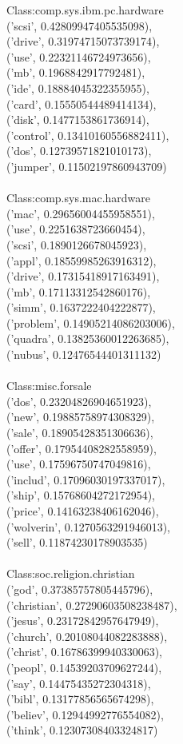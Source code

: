\documentclass[11pt]{article}
\begin{document}
Class:comp.sys.ibm.pc.hardware
\\
('scsi', 0.42809947405535098),\\ ('drive', 0.31974715073739174), \\ ('use', 0.22321146724973656), \\
('mb', 0.1968842917792481), \\
('ide', 0.18884045322355955),\\ ('card', 0.15550544489414134), \\ ('disk', 0.1477153861736914), \\ ('control', 0.13410160556882411),\\ ('dos', 0.12739571821010173),\\ ('jumper', 0.11502197860943709) \\ 
\\
Class:comp.sys.mac.hardware \\
('mac', 0.29656004455958551), \\ ('use', 0.2251638723660454),\\ ('scsi', 0.1890126678045923),\\ ('appl', 0.18559985263916312),\\ ('drive', 0.17315418917163491),\\ ('mb', 0.17113312542860176),\\ ('simm', 0.1637222404222877),\\ ('problem', 0.14905214086203006),\\ ('quadra', 0.13825360012263685),\\ ('nubus', 0.12476544401311132)\\
\\
Class:misc.forsale\\
('dos', 0.23204826904651923),\\ 
('new', 0.19885758974308329),\\ ('sale', 0.18905428351306636),\\ ('offer', 0.17954408282558959),\\ ('use', 0.17596750747049816),\\ ('includ', 0.17096030197337017),\\ ('ship', 0.15768604272172954),\\ ('price', 0.14163238406162046),\\ ('wolverin', 0.1270563291946013), \\ 
('sell', 0.11874230178903535) \\
\\
Class:soc.religion.christian\\
('god', 0.37385757805445796),\\ ('christian', 0.27290603508238487),\\ ('jesus', 0.23172842957647949),\\ ('church', 0.20108044082283888),\\ ('christ', 0.16786399940330063),\\ ('peopl', 0.14539203709627244),\\ ('say', 0.14475435272304318),\\ ('bibl', 0.13177856565674298),\\ ('believ', 0.12944992776554082),\\ ('think', 0.12307308403324817)\\
\end{document}
